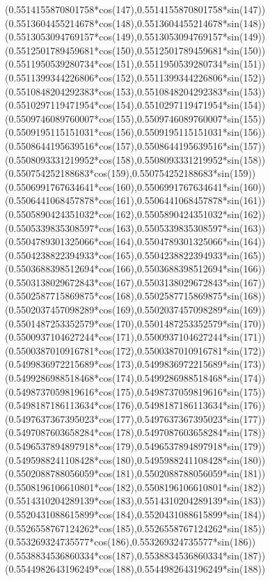{({0.5514155870801758*cos(147)},{0.5514155870801758*sin(147)})
({0.5513604455214678*cos(148)},{0.5513604455214678*sin(148)})
({0.5513053094769157*cos(149)},{0.5513053094769157*sin(149)})
({0.5512501789459681*cos(150)},{0.5512501789459681*sin(150)})
({0.5511950539280734*cos(151)},{0.5511950539280734*sin(151)})
({0.5511399344226806*cos(152)},{0.5511399344226806*sin(152)})
({0.5510848204292383*cos(153)},{0.5510848204292383*sin(153)})
({0.5510297119471954*cos(154)},{0.5510297119471954*sin(154)})
({0.5509746089760007*cos(155)},{0.5509746089760007*sin(155)})
({0.5509195115151031*cos(156)},{0.5509195115151031*sin(156)})
({0.5508644195639516*cos(157)},{0.5508644195639516*sin(157)})
({0.5508093331219952*cos(158)},{0.5508093331219952*sin(158)})
({0.550754252188683*cos(159)},{0.550754252188683*sin(159)})
({0.5506991767634641*cos(160)},{0.5506991767634641*sin(160)})
({0.5506441068457878*cos(161)},{0.5506441068457878*sin(161)})
({0.5505890424351032*cos(162)},{0.5505890424351032*sin(162)})
({0.5505339835308597*cos(163)},{0.5505339835308597*sin(163)})
({0.5504789301325066*cos(164)},{0.5504789301325066*sin(164)})
({0.5504238822394933*cos(165)},{0.5504238822394933*sin(165)})
({0.5503688398512694*cos(166)},{0.5503688398512694*sin(166)})
({0.5503138029672843*cos(167)},{0.5503138029672843*sin(167)})
({0.5502587715869875*cos(168)},{0.5502587715869875*sin(168)})
({0.5502037457098289*cos(169)},{0.5502037457098289*sin(169)})
({0.5501487253352579*cos(170)},{0.5501487253352579*sin(170)})
({0.5500937104627244*cos(171)},{0.5500937104627244*sin(171)})
({0.5500387010916781*cos(172)},{0.5500387010916781*sin(172)})
({0.5499836972215689*cos(173)},{0.5499836972215689*sin(173)})
({0.5499286988518468*cos(174)},{0.5499286988518468*sin(174)})
({0.5498737059819616*cos(175)},{0.5498737059819616*sin(175)})
({0.5498187186113634*cos(176)},{0.5498187186113634*sin(176)})
({0.5497637367395023*cos(177)},{0.5497637367395023*sin(177)})
({0.5497087603658284*cos(178)},{0.5497087603658284*sin(178)})
({0.5496537894897918*cos(179)},{0.5496537894897918*sin(179)})
({0.5495988241108428*cos(180)},{0.5495988241108428*sin(180)})
({0.5502088788056059*cos(181)},{0.5502088788056059*sin(181)})
({0.5508196106610801*cos(182)},{0.5508196106610801*sin(182)})
({0.5514310204289139*cos(183)},{0.5514310204289139*sin(183)})
({0.5520431088615899*cos(184)},{0.5520431088615899*sin(184)})
({0.5526558767124262*cos(185)},{0.5526558767124262*sin(185)})
({0.553269324735577*cos(186)},{0.553269324735577*sin(186)})
({0.5538834536860334*cos(187)},{0.5538834536860334*sin(187)})
({0.5544982643196249*cos(188)},{0.5544982643196249*sin(188)})
}
